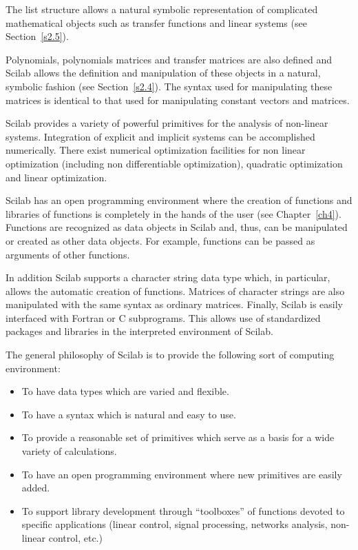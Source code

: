  The list structure allows a natural symbolic representation of complicated
mathematical objects such as transfer functions and linear systems
(see Section~\ref{s2.5}).

	Polynomials, polynomials matrices and transfer matrices 
are also defined and 
Scilab allows the definition and manipulation of these objects in a
natural, symbolic fashion (see Section~\ref{s2.4}). 
The syntax used for manipulating these matrices
is identical to that used for manipulating constant vectors and matrices.

	Scilab provides a variety of powerful primitives for
the analysis of non-linear systems.  
Integration of explicit and implicit systems can be accomplished 
numerically.  There exist numerical optimization 
facilities for non linear optimization (including
non differentiable optimization), quadratic optimization and 
linear optimization.

	Scilab has an open programming environment where the
creation of functions and libraries of functions is completely in the
hands of the user (see Chapter~\ref{ch4}).    
Functions are recognized as data objects in Scilab and, thus, can be 
manipulated or created as other data objects.  For example, functions
can be passed as arguments of other functions.

In addition Scilab supports a character string data type 
which, in particular, allows the automatic creation of functions.
Matrices of character strings are also manipulated with the same
syntax as ordinary matrices.
	Finally, Scilab is easily interfaced with Fortran or C 
subprograms.  This allows use of standardized 
packages and libraries in the interpreted environment of Scilab.

	The general philosophy of Scilab is to provide the following
sort of computing environment:
\begin{itemize}
   \item To have data types which are varied and flexible.
   \item To have a syntax which is natural and easy to use.
   \item To provide a reasonable set of primitives which serve
	   as a basis for a wide variety of calculations.
   \item To have an open programming environment where new
	   primitives are easily added.
   \item To support library development through ``toolboxes'' of
         functions devoted to specific
	   applications (linear control, signal processing, 
	   networks analysis, non-linear control, etc.)
\end{itemize}

